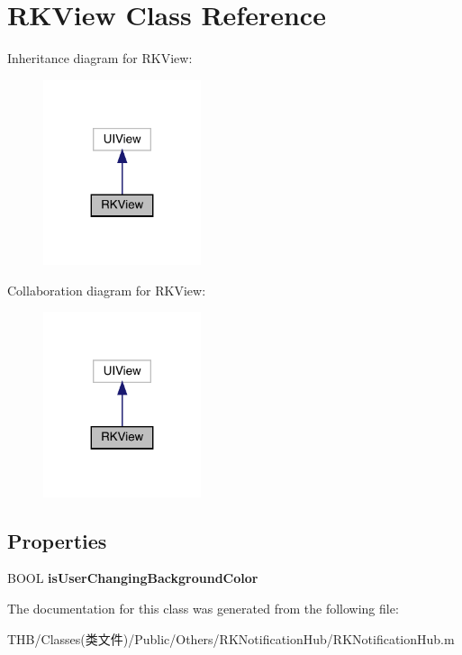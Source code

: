 \hypertarget{interface_r_k_view}{}\section{R\+K\+View Class Reference}
\label{interface_r_k_view}


Inheritance diagram for R\+K\+View\+:\nopagebreak
\begin{figure}[H]
\begin{center}
\leavevmode
\includegraphics[width=131pt]{interface_r_k_view__inherit__graph}
\end{center}
\end{figure}


Collaboration diagram for R\+K\+View\+:\nopagebreak
\begin{figure}[H]
\begin{center}
\leavevmode
\includegraphics[width=131pt]{interface_r_k_view__coll__graph}
\end{center}
\end{figure}
\subsection*{Properties}
\begin{DoxyCompactItemize}
\item 
\mbox{\label{interface_r_k_view_ac37fbfdbc03ddfc208954612c30cab45}} 
B\+O\+OL {\bfseries is\+User\+Changing\+Background\+Color}
\end{DoxyCompactItemize}


The documentation for this class was generated from the following file\+:\begin{DoxyCompactItemize}
\item 
T\+H\+B/\+Classes(类文件)/\+Public/\+Others/\+R\+K\+Notification\+Hub/R\+K\+Notification\+Hub.\+m\end{DoxyCompactItemize}
